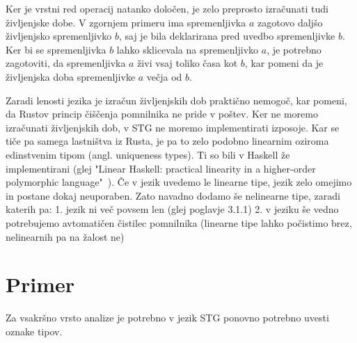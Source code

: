 Ker je vrstni red operacij natanko določen, je zelo preprosto izračunati tudi življenjske dobe. V zgornjem primeru ima spremenljivka $a$ zagotovo daljšo življenjsko spremenljivko $b$, saj je bila deklarirana pred uvedbo spremenljivke $b$. Ker bi se spremenljivka $b$ lahko sklicevala na spremenljivko $a$, je potrebno zagotoviti, da spremenljivka $a$ živi vsaj toliko časa kot $b$, kar pomeni da je življenjska doba spremenljivke $a$ večja od $b$.

Zaradi lenosti jezika je izračun življenjskih dob praktično nemogoč, kar pomeni, da Rustov princip čiščenja pomnilnika ne pride v poštev. Ker ne moremo izračunati življenjskih dob, v STG ne moremo implementirati izposoje. Kar se tiče pa samega lastništva iz Rusta, je pa to zelo podobno linearnim oziroma edinstvenim tipom (angl. uniqueness types). Ti so bili v Haskell že implementirani (glej "Linear Haskell: practical linearity in a higher-order polymorphic language"~\cite{bernardy2018linear}). Če v jezik uvedemo le linearne tipe, jezik zelo omejimo in postane dokaj neuporaben. Zato navadno dodamo še nelinearne tipe, zaradi katerih pa: 1. jezik ni več povsem len (glej poglavje 3.1.1) 2. v jeziku še vedno potrebujemo avtomatičen čistilec pomnilnika (linearne tipe lahko počistimo brez, nelinearnih pa na žalost ne)

\section{Primer}

Za vsakršno vrsto analize je potrebno v jezik STG ponovno potrebno uvesti oznake tipov.
